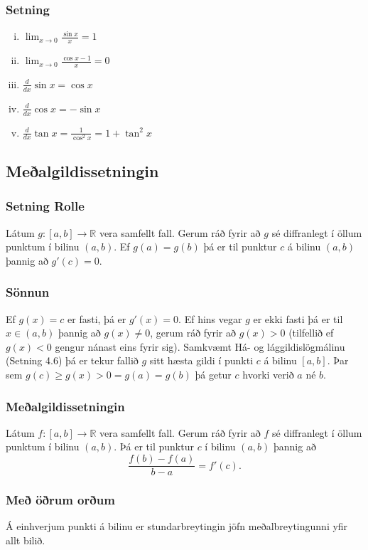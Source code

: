 \documentclass[icelandic,a4paper,12pt]{article}
\newcommand{\R}{{\mathbb  R}}
\begin{document}
 \subsubsection{Setning}
 \begin{enumerate}[(i)]
 \item $\displaystyle\lim_{x\rightarrow 0}\frac{\sin x}{x}=1$
 \pause
\item $\displaystyle\lim_{x\rightarrow 0}\frac{\cos x-1}{x}=0$
\pause
\item $\displaystyle\frac{d}{dx}\sin x=\cos x$
\pause
\item $\displaystyle\frac{d}{dx}\cos x=-\sin x$
\pause
 \item $\displaystyle\frac{d}{dx}\tan x=\frac{1}{\cos^2 x}=1+\tan^2 x$
\end{enumerate}
 
\subsection{Meðalgildissetningin}
\subsubsection{Setning Rolle}    
Látum $g:[a,b]\rightarrow\R$ vera samfellt fall.  Gerum ráð fyrir að $g$ sé diffranlegt í öllum
punktum í bilinu $(a,b)$. \pause Ef $g(a)=g(b)$ þá er til punktur $c$ á bilinu $(a,b)$ þannig að $g'(c)=0$.  
\subsubsection{Sönnun}
	Ef $g(x)=c$ er fasti, þá er $g'(x)=0$. \pause
	Ef hins vegar $g$ er ekki fasti þá er til $x \in (a,b)$ þannig
	að $g(x)\neq 0$, gerum ráð fyrir að $g(x)>0$\pause
	(tilfellið ef $g(x)<0$ gengur nánast eins fyrir sig).\pause
	Samkvæmt Há- og lággildislögmálinu (Setning 4.6) þá er tekur
	fallið $g$ sitt hæsta gildi í punkti $c$ á bilinu $[a,b]$.\pause
	Þar sem $g(c)\geq g(x) > 0 = g(a) = g(b)$ þá getur $c$ hvorki
	verið $a$ né $b$. 
	
\subsubsection{Meðalgildissetningin}   
Látum $f:[a,b]\rightarrow\R$ vera samfellt fall.  Gerum ráð fyrir að $f$ sé diffranlegt í öllum
punktum í bilinu $(a,b)$.  Þá er til punktur $c$ í bilinu $(a,b)$ þannig að
$$\frac{f(b)-f(a)}{b-a}=f'(c).$$

\subsubsection{Með öðrum orðum}
Á einhverjum punkti á bilinu er stundarbreytingin jöfn meðalbreytingunni yfir allt bilið.
\end{document}
